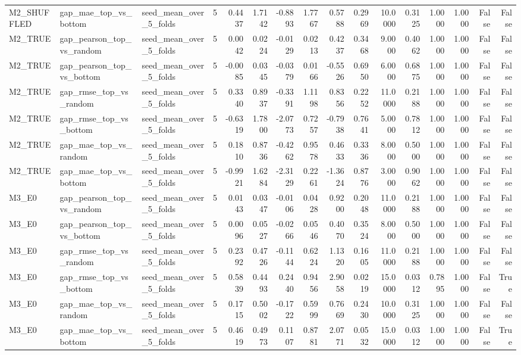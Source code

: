 \begin{tabular}{lllrrrrrrrrrrrrr}
M2_SHUFFLED & gap_mae_top_vs_bottom & seed_mean_over_5_folds & 5 & 0.4437 & 1.7142 & -0.8893 & 1.7767 & 0.5788 & 0.2969 & 10.0000 & 0.3125 & 1.0000 & 1.0000 & False & False \\
M2_TRUE & gap_pearson_top_vs_random & seed_mean_over_5_folds & 5 & 0.0042 & 0.0224 & -0.0129 & 0.0213 & 0.4237 & 0.3468 & 9.0000 & 0.4062 & 1.0000 & 1.0000 & False & False \\
M2_TRUE & gap_pearson_top_vs_bottom & seed_mean_over_5_folds & 5 & -0.0085 & 0.0345 & -0.0379 & 0.0166 & -0.5526 & 0.6950 & 6.0000 & 0.6875 & 1.0000 & 1.0000 & False & False \\
M2_TRUE & gap_rmse_top_vs_random & seed_mean_over_5_folds & 5 & 0.3340 & 0.8937 & -0.3391 & 1.1198 & 0.8356 & 0.2252 & 11.0000 & 0.2188 & 1.0000 & 1.0000 & False & False \\
M2_TRUE & gap_rmse_top_vs_bottom & seed_mean_over_5_folds & 5 & -0.6319 & 1.7800 & -2.0773 & 0.7257 & -0.7938 & 0.7641 & 5.0000 & 0.7812 & 1.0000 & 1.0000 & False & False \\
M2_TRUE & gap_mae_top_vs_random & seed_mean_over_5_folds & 5 & 0.1810 & 0.8736 & -0.4262 & 0.9578 & 0.4633 & 0.3336 & 8.0000 & 0.5000 & 1.0000 & 1.0000 & False & False \\
M2_TRUE & gap_mae_top_vs_bottom & seed_mean_over_5_folds & 5 & -0.9921 & 1.6284 & -2.3129 & 0.2261 & -1.3624 & 0.8776 & 3.0000 & 0.9062 & 1.0000 & 1.0000 & False & False \\
M3_E0 & gap_pearson_top_vs_random & seed_mean_over_5_folds & 5 & 0.0143 & 0.0347 & -0.0106 & 0.0428 & 0.9200 & 0.2048 & 11.0000 & 0.2188 & 1.0000 & 1.0000 & False & False \\
M3_E0 & gap_pearson_top_vs_bottom & seed_mean_over_5_folds & 5 & 0.0096 & 0.0527 & -0.0266 & 0.0546 & 0.4070 & 0.3524 & 8.0000 & 0.5000 & 1.0000 & 1.0000 & False & False \\
M3_E0 & gap_rmse_top_vs_random & seed_mean_over_5_folds & 5 & 0.2392 & 0.4726 & -0.1144 & 0.6224 & 1.1320 & 0.1605 & 11.0000 & 0.2188 & 1.0000 & 1.0000 & False & False \\
M3_E0 & gap_rmse_top_vs_bottom & seed_mean_over_5_folds & 5 & 0.5839 & 0.4493 & 0.2440 & 0.9456 & 2.9058 & 0.0219 & 15.0000 & 0.0312 & 0.7895 & 1.0000 & False & True \\
M3_E0 & gap_mae_top_vs_random & seed_mean_over_5_folds & 5 & 0.1715 & 0.5002 & -0.1722 & 0.5999 & 0.7669 & 0.2430 & 10.0000 & 0.3125 & 1.0000 & 1.0000 & False & False \\
M3_E0 & gap_mae_top_vs_bottom & seed_mean_over_5_folds & 5 & 0.4619 & 0.4973 & 0.1107 & 0.8781 & 2.0771 & 0.0532 & 15.0000 & 0.0312 & 1.0000 & 1.0000 & False & True \\

\end{tabular}
